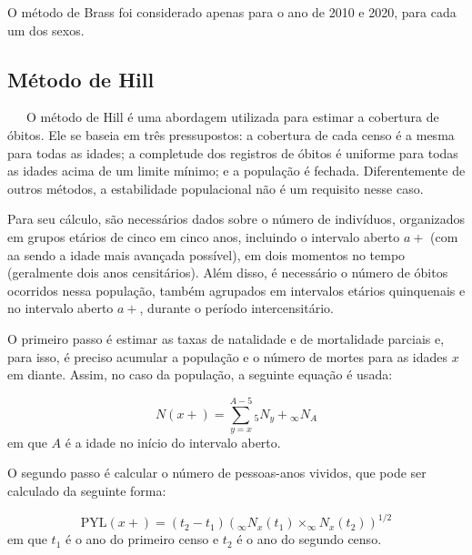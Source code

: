 \documentclass[
  12pt,
  a4paper,
]{scrreprt}
\begin{document}
\vspace{12pt}

O método de Brass foi considerado apenas para o ano de 2010 e 2020, para
cada um dos sexos.

\subsection{Método de Hill}\label{muxe9todo-de-hill}

~~~O método de Hill é uma abordagem utilizada para estimar a cobertura
de óbitos. Ele se baseia em três pressupostos: a cobertura de cada censo
é a mesma para todas as idades; a completude dos registros de óbitos é
uniforme para todas as idades acima de um limite mínimo; e a população é
fechada. Diferentemente de outros métodos, a estabilidade populacional
não é um requisito nesse caso.

\vspace{12pt}

Para seu cálculo, são necessários dados sobre o número de indivíduos,
organizados em grupos etários de cinco em cinco anos, incluindo o
intervalo aberto \(a+\) (com aa sendo a idade mais avançada possível),
em dois momentos no tempo (geralmente dois anos censitários). Além
disso, é necessário o número de óbitos ocorridos nessa população, também
agrupados em intervalos etários quinquenais e no intervalo aberto
\(a+\), durante o período intercensitário.

\vspace{12pt}

O primeiro passo é estimar as taxas de natalidade e de mortalidade
parciais e, para isso, é preciso acumular a população e o número de
mortes para as idades \(x\) em diante. Assim, no caso da população, a
seguinte equação é usada:

\[
N\left(x+\right) = \sum^{A-5}_{y=x} {_5}N_y + {_\infty}N_A
\] em que \(A\) é a idade no início do intervalo aberto.

\vspace{12pt}

O segundo passo é calcular o número de pessoas-anos vividos, que pode
ser calculado da seguinte forma:

\[
\text{PYL}\left(x+\right) = \left(t_{2} - t_{1}\right)\left(_{\infty}N_{x}\left(t_{1}\right)\times_{\infty}N_{x}\left(t_{2}\right)\right)^{1/2}
\] em que \(t_{1}\) é o ano do primeiro censo e \(t_{2}\) é o ano do
segundo censo.

\vspace{12pt}
\end{document}
